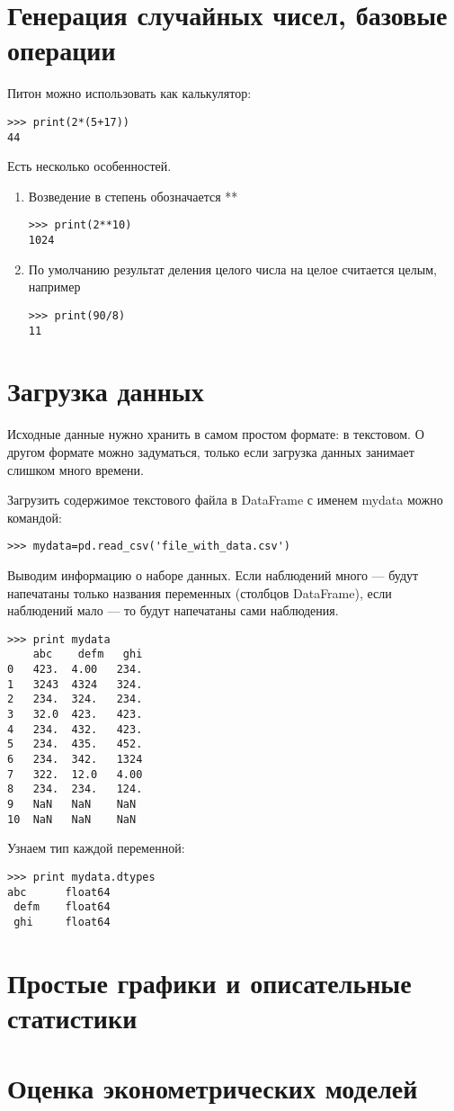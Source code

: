 \documentclass[pdftex,12pt,a4paper]{article}
\begin{document}



\section{Генерация случайных чисел, базовые операции}


Питон можно использовать как калькулятор:
\begin{verbatim}
>>> print(2*(5+17))
44
\end{verbatim}


Есть несколько особенностей.
\begin{enumerate}
\item Возведение в степень обозначается **
\begin{verbatim}
>>> print(2**10)
1024
\end{verbatim}

\item По умолчанию результат деления целого числа на целое считается целым, например
\begin{verbatim}
>>> print(90/8)
11
\end{verbatim}


\end{enumerate}



\section{Загрузка данных}

Исходные данные нужно хранить в самом простом формате: в текстовом. О другом формате можно задуматься, только  если загрузка данных занимает слишком много времени.

Загрузить содержимое текстового файла в DataFrame с именем mydata можно командой:
\begin{verbatim}
>>> mydata=pd.read_csv('file_with_data.csv')
\end{verbatim}


Выводим информацию о наборе данных. Если наблюдений много --- будут напечатаны только названия переменных (столбцов DataFrame), если наблюдений мало --- то будут напечатаны сами наблюдения. 
\begin{verbatim}
>>> print mydata
    abc    defm   ghi
0   423.  4.00   234.
1   3243  4324   324.
2   234.  324.   234.
3   32.0  423.   423.
4   234.  432.   423.
5   234.  435.   452.
6   234.  342.   1324
7   322.  12.0   4.00
8   234.  234.   124.
9   NaN   NaN    NaN 
10  NaN   NaN    NaN 
\end{verbatim}


Узнаем тип каждой переменной:
\begin{verbatim}
>>> print mydata.dtypes
abc      float64
 defm    float64
 ghi     float64
\end{verbatim}




\section{Простые графики и описательные статистики}



\section{Оценка эконометрических моделей}
\end{document}
